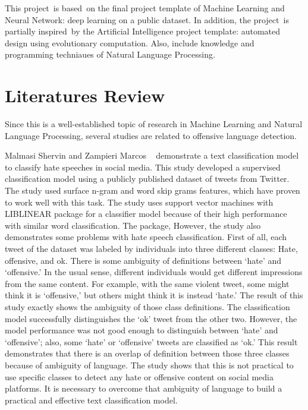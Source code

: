 \documentclass[11pt, natbib=false]{article}
\begin{document}
This project is based on the final project template of Machine Learning and Neural Network: deep learning on a public dataset.
In addition, the project is partially inspired by the Artificial Intelligence project template: automated design using evolutionary computation.
Also, include knowledge and programming techniaues of Natural Language Processing. 

\section{Literatures Review}
Since this is a well-established topic of research in Machine Learning and Natural Language Processing, several studies are related to offensive language detection. 

Malmasi Shervin and Zampieri Marcos ~\cite{malmasi2017detecting} demonstrate a text classification model to classify hate speeches in social media. This study developed a supervised classification model using a publicly published dataset of tweets from Twitter.
The study used surface n-gram and word skip grams features, which have proven to work well with this task. The study uses support vector machines with LIBLINEAR package for a classifier model because of their high performance with similar word classification.
The package, However, the study also demonstrates some problems with hate speech classification. First of all, each tweet of the dataset was labeled by individuals into three different classes: Hate, offensive, and ok.
There is some ambiguity of definitions between ‘hate’ and ‘offensive.’ In the usual sense, different individuals would get different impressions from the same content.
For example, with the same violent tweet, some might think it is ‘offensive,’ but others might think it is instead ‘hate.’
The result of this study exactly shows the ambiguity of those class definitions. The classification model successfully distinguishes the ‘ok’ tweet from the other two. However, the model performance was not good enough to distinguish between ‘hate’ and ‘offensive’; also, some ‘hate’ or ‘offensive’ tweets are classified as ‘ok.’
This result demonstrates that there is an overlap of definition between those three classes because of ambiguity of language.
The study shows that this is not practical to use specific classes to detect any hate or offensive content on social media platforms.
It is necessary to overcome that ambiguity of language to build a practical and effective text classification model. 
\end{document}
